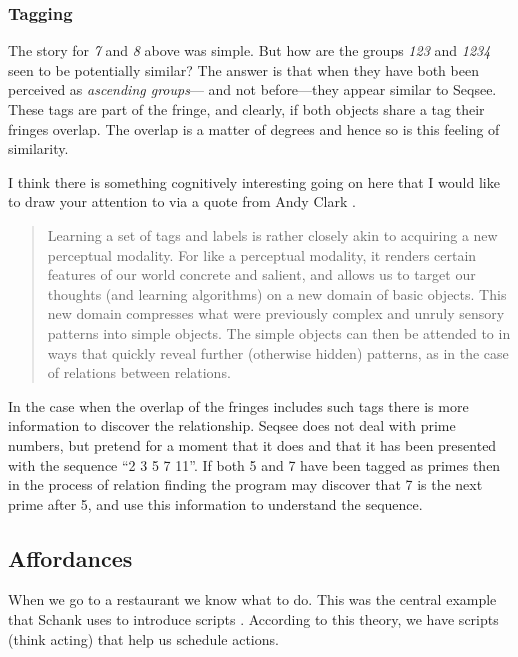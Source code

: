 \subsubsection{Tagging}
\label{sec:tagging}

The story for \emph{7} and \emph{8} above was simple.  But how are the groups \emph{123} and \emph{1234} seen to be potentially similar?  The answer is that when they have both been perceived as \emph{ascending groups}--- and not before---they appear similar to Seqsee.  These tags are part of the fringe, and clearly, if both objects share a tag their fringes overlap.  The overlap is a matter of degrees and hence so is this feeling of similarity.

I think there is something cognitively interesting going on here that I would like to draw your attention to via a quote from Andy Clark \cite{Clark:MindWare}.

\begin{quote}
Learning a set of tags and labels is rather closely akin to acquiring a new perceptual modality.  For like a perceptual modality, it renders certain features of our world concrete and salient, and allows us to target our thoughts (and learning algorithms) on a new domain of basic objects.  This new domain compresses what were previously complex and unruly sensory patterns into simple objects.  The simple objects can then be attended to in ways that quickly reveal further (otherwise hidden) patterns, as in the case of relations between relations.
\end{quote}


In the case when the overlap of the fringes includes such tags there is more information to discover the relationship.  Seqsee does not deal with prime numbers, but pretend for a moment that it does and that it has been presented with the sequence ``2 3 5 7 11''. If both 5 and 7 have been tagged as primes then in the process of relation finding the program may discover that 7 is the next prime after 5, and use this information to understand the sequence.


\subsection{Affordances}
\label{sec:affordances}

When we go to a restaurant we know what to do.  This was the central example that Schank uses to introduce scripts \cite{Schank+Abelson}.  According to this theory, we have scripts (think acting) that help us schedule actions. 

